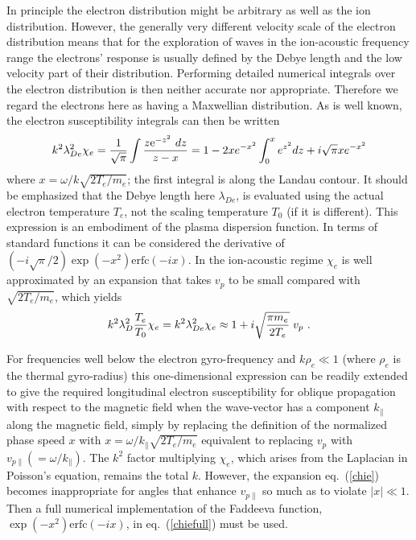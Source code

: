 \documentclass[12pt]{article}
\begin{document}
In principle the electron distribution might be arbitrary as well as
the ion distribution. However, the generally very different velocity
scale of the electron distribution means that for the exploration of
waves in the ion-acoustic frequency range the electrons' response is
usually defined by the Debye length and the low velocity part of their
distribution. Performing detailed numerical integrals over the
electron distribution is then neither accurate nor appropriate. Therefore
we regard the electrons here as having a Maxwellian distribution. As
is well known, the electron susceptibility integrals can then be
written
\begin{equation}\label{chiefull}
   k^2\lambda_{De}^2 \chi_e = {1\over \sqrt{\pi}} \int {z {\rm
       e}^{-z^2} \ dz\over z-x} =
1 -2xe^{-x^2}\int_0^x e^{z^2}dz + i\sqrt{\pi} x e^{-x^2}
\end{equation}
where $x=\omega/k\sqrt{2T_e/m_e}$; the first integral is along the
Landau contour. It should be emphasized that the Debye length here
$\lambda_{De}$, is evaluated using the actual electron temperature
$T_e$, not the scaling temperature $T_0$ (if it is different). This
expression is an embodiment of the plasma dispersion function. In
terms of standard functions it can be considered the derivative of
$(-i\sqrt{\pi}/2)\exp(-x^2)\mbox{erfc}(-ix)$. In the ion-acoustic
regime $\chi_e$ is well approximated by an expansion that takes $v_p$
to be small compared with $\sqrt{2T_e/m_e}$, which yields
\begin{equation}\label{chie}
   k^2\lambda_{D}^2 {T_e\over T_0} \chi_e=
k^2\lambda_{De}^2 \chi_e \approx 1 + i \sqrt{\pi m_e\over 2 T_e}\; v_p\ .
\end{equation}

For frequencies well below the electron gyro-frequency and
$k \rho_e \ll 1$ (where $\rho_e$ is the thermal gyro-radius) this
one-dimensional expression can be readily extended to give the
required longitudinal electron susceptibility for oblique propagation
with respect to the magnetic field when the wave-vector has a
component $k_\parallel$ along the magnetic field, simply by replacing
the definition of the normalized phase speed $x$ with
$x=\omega/k_\parallel\sqrt{2T_e/m_e}$ equivalent to replacing $v_p$ with
$v_{p\parallel}(=\omega/k_\parallel)$. The $k^2$ factor multiplying
$\chi_e$, which arises from the Laplacian in Poisson's equation,
remains the total $k$. However, the expansion eq.\ (\ref{chie})
becomes inappropriate for angles that enhance $v_{p\parallel}$ so much
as to violate $|x|\ll 1$. Then a full numerical implementation of the
Faddeeva function, $\exp(-x^2)\mbox{erfc}(-ix)$, in eq.\
(\ref{chiefull}) must be used.
\end{document}
